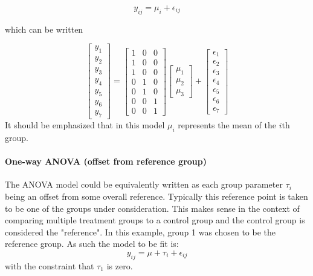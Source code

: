 \begin{equation}
  y_{ij} = \mu_i + \epsilon_{ij}
\end{equation}

which can be written

\begin{equation}
  \begin{bmatrix}y_1 \\ y_2 \\ y_3 \\ y_4 \\ y_5 \\ y_6 \\ y_7 \end{bmatrix} =
  \begin{bmatrix}1 & 0 & 0 \\1 &0  &0 \\ 1 & 0 & 0 \\  0 & 1 & 0 \\  0 & 1 & 0 \\  0 & 0 & 1 \\  0 & 0 & 1\end{bmatrix}
  \begin{bmatrix}\mu_1 \\ \mu_2 \\ \mu_3  \end{bmatrix}
  +
  \begin{bmatrix} \epsilon_1 \\ \epsilon_2 \\ \epsilon_3 \\ \epsilon_4 \\ \epsilon_5 \\ \epsilon_6 \\ \epsilon_7 \end{bmatrix}
\end{equation}
It should be emphasized that in this model $\mu_i$ represents the mean of the $i$th group.

\paragraph{One-way ANOVA (offset from reference group)}
The ANOVA model could be equivalently written as each group parameter $\tau_i$ being an offset from some overall reference.  Typically this reference point is taken to be one of the groups under consideration. This makes sense in the context of comparing multiple treatment groups to a control group and the control group is considered the "reference". In this example, group 1 was chosen to be the reference group. As such the model to be fit is:
\begin{equation}
  y_{ij} = \mu + \tau_i + \epsilon_{ij}
\end{equation}
with the constraint that $\tau_1$ is zero.

